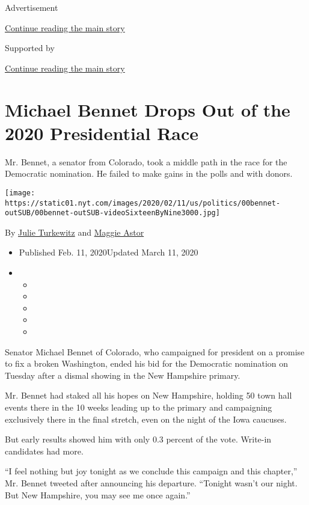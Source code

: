 Advertisement

\protect\hyperlink{after-top}{Continue reading the main story}

Supported by

\protect\hyperlink{after-sponsor}{Continue reading the main story}

\hypertarget{michael-bennet-drops-out-of-the-2020-presidential-race}{%
\section{Michael Bennet Drops Out of the 2020 Presidential
Race}\label{michael-bennet-drops-out-of-the-2020-presidential-race}}

Mr. Bennet, a senator from Colorado, took a middle path in the race for
the Democratic nomination. He failed to make gains in the polls and with
donors.

\texttt{[image: https://static01.nyt.com/images/2020/02/11/us/politics/00bennet-outSUB/00bennet-outSUB-videoSixteenByNine3000.jpg]}

By \href{https://www.nytimes.com/by/julie-turkewitz}{Julie Turkewitz}
and \href{https://www.nytimes.com/by/maggie-astor}{Maggie Astor}

\begin{itemize}
\item
  Published Feb. 11, 2020Updated March 11, 2020
\item
  \begin{itemize}
  \item
  \item
  \item
  \item
  \item
  \end{itemize}
\end{itemize}

Senator Michael Bennet of Colorado, who campaigned for president on a
promise to fix a broken Washington, ended his bid for the Democratic
nomination on Tuesday after a dismal showing in the New Hampshire
primary.

Mr. Bennet had staked all his hopes on New Hampshire, holding 50 town
hall events there in the 10 weeks leading up to the primary and
campaigning exclusively there in the final stretch, even on the night of
the Iowa caucuses.

But early results showed him with only 0.3 percent of the vote. Write-in
candidates had more.

``I feel nothing but joy tonight as we conclude this campaign and this
chapter,'' Mr. Bennet tweeted after announcing his departure. ``Tonight
wasn't our night. But New Hampshire, you may see me once again.''


